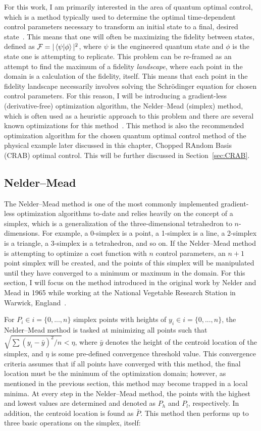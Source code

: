 For this work, I am primarily interested in the area of quantum optimal control, which is a method typically used to determine the optimal time-dependent control parameters necessary to transform an initial state to a final, desired state~\cite{werschnik2007}.
This means that one will often be maximizing the fidelity between states, defined as $\mathcal{F} = |\braket{\psi|\phi}|^2$, where $\psi$ is the engineered quantum state and $\phi$ is the state one is attempting to replicate.
This problem can be re-framed as an attempt to find the maximum of a fidelity \textit{landscape}, where each point in the domain is a calculation of the fidelity, itself.
This means that each point in the fidelity landscape necessarily involves solving the Schr\"odinger equation for chosen control parameters.
For this reason, I will be introducing a gradient-less (derivative-free) optimization algorithm, the Nelder--Mead (simplex) method, which is often used as a heuristic approach to this problem and there are several known optimizations for this method~\cite{nelder1965,kolda2003,lewis2007}.
This method is also the recommended optimization algorithm for the chosen quantum optimal control method of the physical example later discussed in this chapter, Chopped RAndom Basis (CRAB) optimal control.
This will be further discussed in Section~\ref{sec:CRAB}.

\subsection{Nelder--Mead}
\label{sec:NM}

The Nelder--Mead method is one of the most commonly implemented gradient-less optimization algorithms to-date and relies heavily on the concept of a simplex, which is a generalization of the three-dimensional tetrahedron to $n$-dimensions.
For example, a 0-simplex is a point, a 1-simplex is a line, a 2-simplex is a triangle, a 3-simplex is a tetrahedron, and so on.
If the Nelder--Mead method is attempting to optimize a cost function with $n$ control parameters, an $n+1$ point simplex will be created, and the points of this simplex will be manipulated until they have converged to a minimum or maximum in the domain.
For this section, I will focus on the method introduced in the original work by Nelder and Mead in 1965 while working at the National Vegetable Research Station in Warwick, England~\cite{nelder1965}.

For $P_i \in i=\{0,...,n\}$ simplex points with heights of $y_i \in i=\{0,...,n\}$, the Nelder--Mead method is tasked at minimizing all points such that $\sqrt{\sum(y_i-\bar y)^2/n} < \eta$, where $\bar y$ denotes the height of the centroid location of the simplex, and $\eta$ is some pre-defined convergence threshold value.
This convergence criteria assumes that if all points have converged with this method, the final location must be the minimum of the optimization domain; however, as mentioned in the previous section, this method may become trapped in a local minima.
At every step in the Nelder--Mead method, the points with the highest and lowest values are determined and denoted as $P_h$ and $P_l$, respectively.
In addition, the centroid location is found as $\bar P$.
This method then performs up to three basic operations on the simplex, itself:

